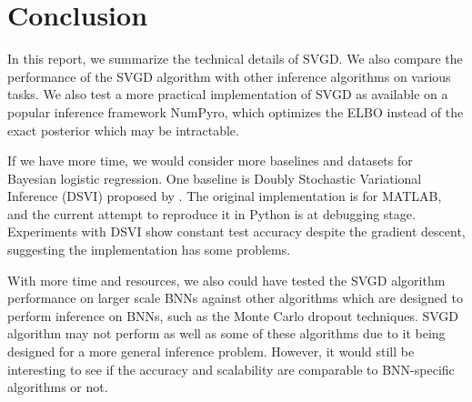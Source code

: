 \section{Conclusion}
In this report, we summarize the technical details of SVGD. We also compare the performance of the SVGD algorithm with other inference algorithms on various tasks. We also test a more practical implementation of SVGD as available on a popular inference framework NumPyro, which optimizes the ELBO instead of the exact posterior which may be intractable.

If we have more time, we would consider more baselines and datasets for Bayesian logistic regression. One baseline is Doubly Stochastic Variational Inference (DSVI) proposed by \cite{ref_dsvi}. The original implementation is for MATLAB, and the current attempt to reproduce it in Python is at debugging stage. Experiments with DSVI show constant test accuracy despite the gradient descent, suggesting the implementation has some problems.

With more time and resources, we also could have tested the SVGD algorithm performance on larger scale BNNs against other algorithms which are designed to perform inference on BNNs, such as the Monte Carlo dropout techniques. SVGD algorithm may not perform as well as some of these algorithms due to it being designed for a more general inference problem. However, it would still be interesting to see if the accuracy and scalability are comparable to BNN-specific algorithms or not.